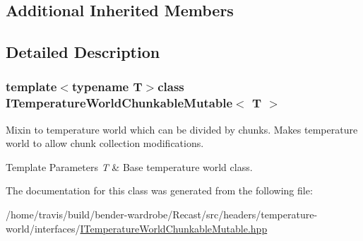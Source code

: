 \subsection*{Additional Inherited Members}


\subsection{Detailed Description}
\subsubsection*{template$<$typename T$>$class I\-Temperature\-World\-Chunkable\-Mutable$<$ T $>$}

Mixin to temperature world which can be divided by chunks. Makes temperature world to allow chunk collection modifications.


\begin{DoxyTemplParams}{Template Parameters}
{\em T} & Base temperature world class. \\
\hline
\end{DoxyTemplParams}


The documentation for this class was generated from the following file\-:\begin{DoxyCompactItemize}
\item 
/home/travis/build/bender-\/wardrobe/\-Recast/src/headers/temperature-\/world/interfaces/\hyperlink{_i_temperature_world_chunkable_mutable_8hpp}{I\-Temperature\-World\-Chunkable\-Mutable.\-hpp}\end{DoxyCompactItemize}
